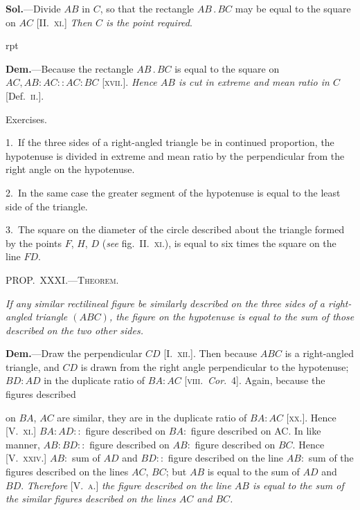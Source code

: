 \documentclass[oneside]{book}
\newcounter{wrapwidth}
\newcommand\mypropl[2]{
\bigskip\Needspace*{4\baselineskip}\begin{center}\textsc{#1}\end{center}
\hspace{\parindent}\emph{#2}\par\medskip
}
\newcommand\exhead[1]{
\Needspace*{5\baselineskip}\begin{center}
\textsf{#1}
\end{center}
}
\newcommand\imgflow[3]{
\setcounter{wrapwidth}{#1}

\begin{wrapfigure}[#2]{r}{\value{wrapwidth}pt}
\begin{center}
\vspace{-0.3in}

\end{center}
\end{wrapfigure}
}
\begin{document}
\textbf{Sol.}---Divide $AB$ in $C$, so that the rectangle $AB\,.\,BC$
may be equal to the square on $AC$
[II\@.~\textsc{xi}.] \textit{Then $C$ is the point required}.


\imgflow{110}{2}{f259}

\textbf{Dem.}---Because the rectangle $AB\,.\,BC$ is equal to the
square on $AC, AB:AC::AC:BC$ [\textsc{xvii}.]. \textit{Hence $AB$
is cut in extreme and mean ratio in $C$} [Def.~\textsc{ii}.].

\exhead{Exercises.}

\begin{footnotesize}
1.~If the three sides of a right-angled triangle be in continued
proportion, the hypotenuse is divided in extreme and mean ratio
by the perpendicular from the right angle on the hypotenuse.

2.~In the same case the greater segment of the hypotenuse is
equal to the least side of the triangle.

3.~The square on the diameter of the circle described about the
triangle formed by the points $F$, $H$, $D$ (\textit{see} fig.~II\@.\ \textsc{xi}.), is equal to
six times the square on the line $FD$.
\par\end{footnotesize}

\mypropl{PROP\@.~XXXI\@.---Theorem.}{If any similar rectilineal figure be similarly described
on the three sides of a right-angled triangle $(ABC)$, the
figure on the hypotenuse is equal to the sum of those described
on the two other sides.}

\textbf{Dem.}---Draw the perpendicular $CD$ [I.~\textsc{xii}.]. Then
because $ABC$ is a right-angled triangle, and $CD$ is
drawn from the right angle perpendicular to the hypotenuse;
$BD:AD$ in the duplicate ratio of $BA:AC$
[\textsc{viii}.~\textit{Cor}.~4]. Again, because the figures described

on $BA$, $AC$ are similar, they are in the duplicate ratio
of $BA:AC$ [\textsc{xx}.]. Hence [V.~\textsc{xi}.] $BA : AD ::$ figure
described on $BA :$ figure described on AC\@. In like
manner, $AB : BD ::$ figure described on $AB :$ figure
described on $BC$. Hence [V.~\textsc{xxiv}.] $AB :$ sum of $AD$
and $BD ::$ figure described on the line $AB :$ sum of
the figures described on the lines $AC$, $BC$; but $AB$
is equal to the sum of $AD$ and $BD$.
\textit{Therefore} [V.~\textsc{a}.] \textit{the figure described on the line $AB$ is equal to the sum of
the similar figures described on the lines $AC$ and $BC$.}
\end{document}
